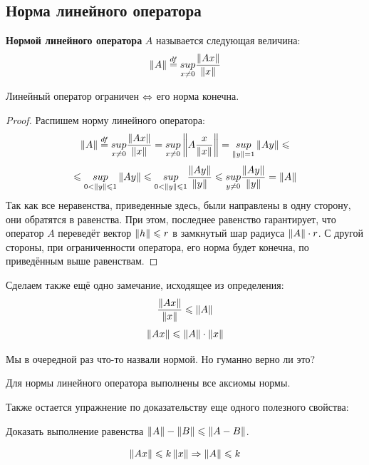 \documentclass[12pt]{article}
\begin{document}
	\subsection{Норма линейного оператора}
	
		\begin{defi}
			\textbf{Нормой линейного оператора} $A$ называется следующая величина: 
			$$\left\| A \right\| \overset{df}{=} \underset{x \neq 0}{sup} \frac{\left\| Ax \right\|}{\left\| x \right\|}$$
		\end{defi}
	
		\begin{state}
			Линейный оператор ограничен $\Leftrightarrow$ его норма конечна.
		\end{state}
		\begin{proof}
			Распишем норму линейного оператора:
			$$
				\left\| A \right\| \overset{df}{=} \underset{x \neq 0}{sup} \frac{\left\| Ax \right\|}{\left\| x \right\|} = 
				\underset{x \neq 0}{sup} \left\| A \frac{x}{\left\| x \right\|} \right\| =
				\underset{\left\| y \right\| = 1}{sup} \left\| Ay \right\| \leqslant
			$$
			$$
				\leqslant
				\underset{0 < \left\| y \right\| \leqslant 1}{sup} \left\| Ay \right\| \leqslant
				\underset{0 < \left\| y \right\| \leqslant 1}{sup} \frac{\left\| Ay \right\|}{\left\| y \right\|} \leqslant
				\underset{y \neq 0}{sup} \frac{\left\| Ay \right\|}{\left\| y \right\|} =
				\left\| A \right\|
			$$
			Так как все неравенства, приведенные здесь, были направлены в одну сторону,
			они обратятся в равенства. При этом, последнее равенство гарантирует, что
			оператор $A$ переведёт вектор $\left\| h \right\| \leqslant r$ в замкнутый шар радиуса $\left\| A \right\| \cdot r$.
			С другой стороны, при ограниченности оператора, его норма будет конечна, по приведённым
			выше равенствам.
		\end{proof}
	
		Сделаем также ещё одно замечание, исходящее из определения:
		$$ \frac{\left\| Ax \right\|}{\left\| x \right\|} \leqslant \left\| A \right\| $$
		$$ \left\| Ax \right\| \leqslant \left\| A \right\| \cdot \left\| x \right\| $$
	
		Мы в очередной раз что-то назвали нормой. Но {\color{gray}гуманно} верно ли это?
	
		\exc Для нормы линейного оператора выполнены все аксиомы нормы.
	
		Также остается упражнение по доказательству еще одного полезного свойства:

		\exc Доказать выполнение равенства $\left\| A \right\| - \left\| B \right\| \leqslant \left\| A-B \right\|$.
	
		\begin{state}
			$$\left\| Ax \right\| \leqslant k \left\| x \right\| \Rightarrow \left\| A \right\| \leqslant k$$
		\end{state}
	
\end{document}
